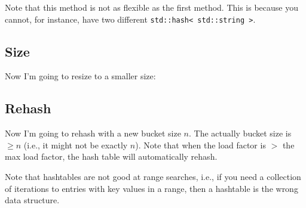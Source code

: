 Note that this method is not as flexible as the first method.
This is because you cannot, for instance, have two different
\verb!std::hash< std::string >!.


\subsection{Size}

Now I'm going to resize to a smaller size:


\vspace{-0.1cm}
{\small
{}
}



\subsection{Rehash}

Now I'm going to rehash with a new bucket size $n$.
The actually bucket size is $\geq n$ (i.e., it might not be exactly $n$).
Note that when the load factor is $>$ the max load factor, the hash table
will automatically rehash.


\vspace{-0.1cm}
{\small
{}
}

















  
Note that hashtables are not good at range searches, i.e.,
if you need a collection of iterations to entries with key
values in a range, then a hashtable is the wrong data structure.

\newpage{}
